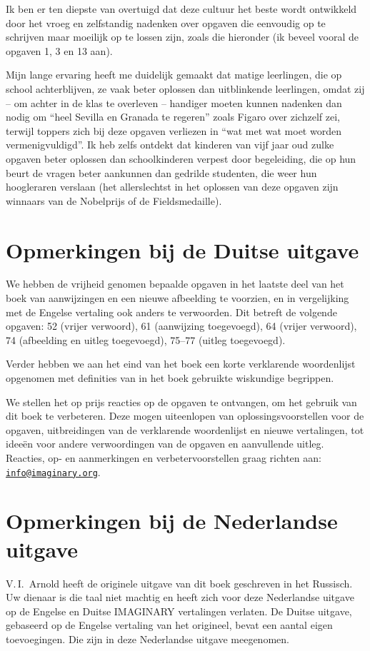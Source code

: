 Ik ben er ten diepste van overtuigd dat deze cultuur het beste wordt ontwikkeld door het vroeg en zelfstandig nadenken over opgaven die eenvoudig op te schrijven maar moeilijk op te lossen zijn, zoals die hieronder (ik beveel vooral de opgaven 1, 3 en 13 aan).

Mijn lange ervaring heeft me duidelijk gemaakt dat matige leerlin\-gen, die op school achterblijven, ze vaak beter oplossen dan uitblin\-kende leerlingen, omdat zij -- om achter in de klas te overleven -- handiger moeten kunnen nadenken dan nodig om \enquote{heel Sevilla en Granada te regeren} zoals Figaro over zichzelf zei, terwijl toppers zich bij deze opgaven verliezen in \enquote{wat met wat moet worden vermenig\-vuldigd}. Ik heb zelfs ontdekt dat kinderen van vijf jaar oud zulke opgaven beter oplossen dan schoolkinderen verpest door begeleiding, die op hun beurt de vragen beter aankunnen dan gedrilde studenten, die weer hun hoogleraren verslaan (het allerslechtst in het oplossen van deze opgaven zijn winnaars van de Nobelprijs of de Fieldsmedaille).

\clearpage

\section*{Opmerkingen bij de Duitse uitgave}
We hebben de vrijheid genomen bepaalde opgaven in het laatste deel van het boek van aanwijzingen en een nieuwe afbeelding te voorzien, en in vergelijking met de Engelse vertaling ook anders te verwoorden. Dit betreft de volgende opgaven: 52 (vrijer verwoord), 61 (aanwijzing toegevoegd), 64 (vrijer verwoord), 74 (afbeelding en uitleg toegevoegd), 75--77 (uitleg toegevoegd).

Verder hebben we aan het eind van het boek een korte verklarende woordenlijst opgenomen met definities van in het boek gebruikte wis\-kundige begrippen.

We stellen het op prijs reacties op de opgaven te ontvangen, om het gebruik van dit boek te verbeteren. Deze mogen uiteenlopen van oplossingsvoorstellen voor de opgaven, uitbreidingen van de verklaren\-de woordenlijst en nieuwe vertalingen, tot ideeën voor andere verwoor\-dingen van de opgaven en aanvullende uitleg. Reacties, op- en aanmer\-kingen en verbetervoorstellen graag richten aan:\\\href{mailto:info@imaginary.org}{\nolinkurl{info@imaginary.org}}.
\\
\section*{Opmerkingen bij de Nederlandse uitgave}
V.\,I.~Arnold heeft de originele uitgave van dit boek geschreven in het Russisch. Uw dienaar is die taal niet machtig en heeft zich voor deze Nederlandse uitgave op de Engelse en Duitse IMAGINARY vertalin\-gen verlaten. De Duitse uitgave, gebaseerd op de Engelse vertaling van het origineel, bevat een aantal eigen toevoegingen. Die zijn in deze Nederlandse uitgave meegenomen.

